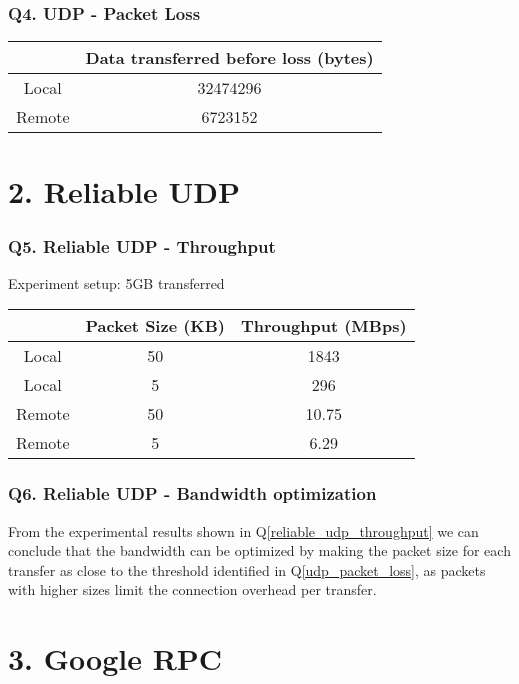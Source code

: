 \documentclass[a4paper]{article}
\begin{document}
\section*{Q4. UDP - Packet Loss} \label{udp_packet_loss}
\begin{center}
	\begin{tabular}{ |c|c| } 
		\hline
		& Data transferred before loss (bytes) \\ 
		\hline
		\hline
		Local & 32474296 \\ 
		\hline
		Remote & 6723152 \\ 
		\hline
	\end{tabular}
\end{center}

\newpage

\part*{2. Reliable UDP}

\section*{Q5. Reliable UDP - Throughput} \label{reliable_udp_throughput}
Experiment setup: 5GB transferred
\begin{center}
	\begin{tabular}{ |c|c|c| } 
		\hline
		& Packet Size (KB) & Throughput (MBps) \\ 
		\hline
		\hline
		Local & 50 & 1843 \\ 
		\hline
		Local & 5 & 296 \\ 
		\hline
		Remote & 50 & 10.75 \\ 
		\hline
		Remote & 5 & 6.29 \\ 
		\hline
	\end{tabular}
\end{center}

\section*{Q6. Reliable UDP - Bandwidth optimization}
From the experimental results shown in Q\ref{reliable_udp_throughput} we can conclude that the bandwidth can be optimized by making the packet size for each transfer as close to the threshold identified in Q\ref{udp_packet_loss}, as packets with higher sizes limit the connection overhead per transfer.

\newpage

\part*{3. Google RPC}
\end{document}
